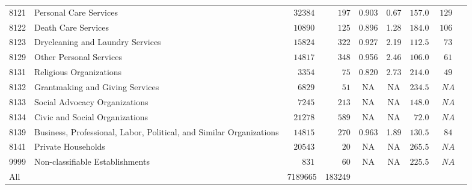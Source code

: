 \documentclass[9pt, oneside]{article}   	%
\begin{document}
\begin{longtable}{lp{3 in}ccccccc}
8121  & Personal Care Services & $\phantom{0}32384$ & $\phantom{000}197$ & 0.903 &  0.67 & $157.0$ & $129$ \\
8122  & Death Care Services & $\phantom{0}10890$ & $\phantom{000}125$ & 0.896 &  1.28 & $184.0$ & $106$ \\
8123  & Drycleaning and Laundry Services & $\phantom{0}15824$ & $\phantom{000}322$ & 0.927 &  2.19 & $112.5$ & $\phantom{0}73$ \\
8129  & Other Personal Services & $\phantom{0}14817$ & $\phantom{000}348$ & 0.956 &  2.46 & $106.0$ & $\phantom{0}61$ \\
8131  & Religious Organizations & $\phantom{00}3354$ & $\phantom{0000}75$ & 0.820 &  2.73 & $214.0$ & $\phantom{0}49$ \\
8132  & Grantmaking and Giving Services & $\phantom{00}6829$ & $\phantom{0000}51$ &    NA &    NA & $234.5$ & $\phantom{0}NA$ \\
8133  & Social Advocacy Organizations & $\phantom{00}7245$ & $\phantom{000}213$ &    NA &    NA & $148.0$ & $\phantom{0}NA$ \\
8134  & Civic and Social Organizations & $\phantom{0}21278$ & $\phantom{000}589$ &    NA &    NA & $\phantom{0}72.0$ & $\phantom{0}NA$ \\
8139  & Business, Professional, Labor, Political, and Similar Organizations & $\phantom{0}14815$ & $\phantom{000}270$ & 0.963 &  1.89 & $130.5$ & $\phantom{0}84$ \\
8141  & Private Households & $\phantom{0}20543$ & $\phantom{0000}20$ &    NA &    NA & $265.5$ & $\phantom{0}NA$ \\
9999  & Non-classifiable Establishments & $\phantom{000}831$ & $\phantom{0000}60$ &    NA &    NA & $225.5$ & $\phantom{0}NA$ \\
\cline{1-1} \cline{2-2} \cline{3-3} \cline{4-4} \cline{5-5} \cline{6-6} \cline{7-7} \cline{8-8} %
All    &  & 7189665 & 183249 &  &          &  &  \\
\hline 
\end{longtable}



\pagebreak














\end{document}
